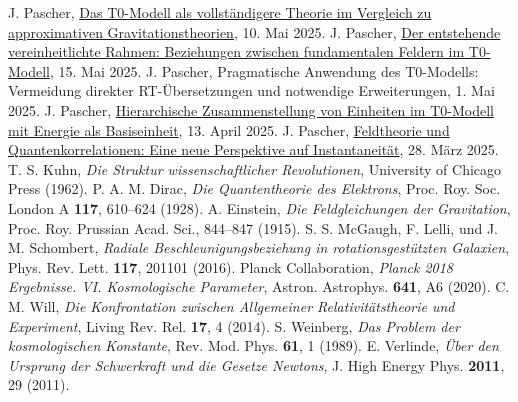 \documentclass[12pt,a4paper]{article}
\begin{document}
\begin{thebibliography}{99}
		 J. Pascher, \href{https://github.com/jpascher/T0-Time-Mass-Duality/tree/main/2/pdf/English/T0-ModelAsCompleteTheory_En.pdf}{Das T0-Modell als vollständigere Theorie im Vergleich zu approximativen Gravitationstheorien}, 10. Mai 2025.
		 J. Pascher, \href{https://github.com/jpascher/T0-Time-Mass-Duality/tree/main/2/pdf/English/ausblicke_En.pdf}{Der entstehende vereinheitlichte Rahmen: Beziehungen zwischen fundamentalen Feldern im T0-Modell}, 15. Mai 2025.
		 J. Pascher, {Pragmatische Anwendung des T0-Modells: Vermeidung direkter RT-Übersetzungen und notwendige Erweiterungen}, 1. Mai 2025.
		 J. Pascher, \href{https://github.com/jpascher/T0-Time-Mass-Duality/tree/main/2/pdf/English/NatEinheitenSystematikEn.pdf}{Hierarchische Zusammenstellung von Einheiten im T0-Modell mit Energie als Basiseinheit}, 13. April 2025.
		 J. Pascher, \href{https://github.com/jpascher/T0-Time-Mass-Duality/tree/main/2/pdf/English/FeldtheorieQuantenEn.pdf}{Feldtheorie und Quantenkorrelationen: Eine neue Perspektive auf Instantaneität}, 28. März 2025.
		 T. S. Kuhn, \textit{Die Struktur wissenschaftlicher Revolutionen}, University of Chicago Press (1962).
		 P. A. M. Dirac, \textit{Die Quantentheorie des Elektrons}, Proc. Roy. Soc. London A \textbf{117}, 610--624 (1928).
		 A. Einstein, \textit{Die Feldgleichungen der Gravitation}, Proc. Roy. Prussian Acad. Sci., 844--847 (1915).
		 S. S. McGaugh, F. Lelli, und J. M. Schombert, \textit{Radiale Beschleunigungsbeziehung in rotationsgestützten Galaxien}, Phys. Rev. Lett. \textbf{117}, 201101 (2016).
		 Planck Collaboration, \textit{Planck 2018 Ergebnisse. VI. Kosmologische Parameter}, Astron. Astrophys. \textbf{641}, A6 (2020).
		 C. M. Will, \textit{Die Konfrontation zwischen Allgemeiner Relativitätstheorie und Experiment}, Living Rev. Rel. \textbf{17}, 4 (2014).
		 S. Weinberg, \textit{Das Problem der kosmologischen Konstante}, Rev. Mod. Phys. \textbf{61}, 1 (1989).
		 E. Verlinde, \textit{Über den Ursprung der Schwerkraft und die Gesetze Newtons}, J. High Energy Phys. \textbf{2011}, 29 (2011).
	\end{thebibliography}
	
	
\end{document}
